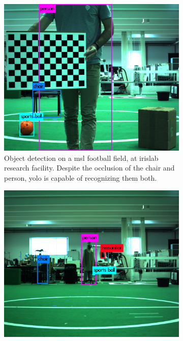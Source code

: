 \begin{figure}[ht]
	\centering
	\begin{subfigure}[t]{0.45\textwidth}
		\includegraphics[width=\textwidth]{img/object-detection/experimental-1.jpg}
		\caption{Object detection on a \ac{msl} football field, at \ac{irislab} research facility. Despite the occlusion of the chair and person, \ac{yolo} is capable of recognizing them both.}
		\label{fig:experimental-yolo-1}
	\end{subfigure}
	\qquad
	\begin{subfigure}[t]{0.45\textwidth}
		\includegraphics[width=\textwidth]{img/object-detection/experimental-2.jpg}

\end{subfigure}
\end{figure}
